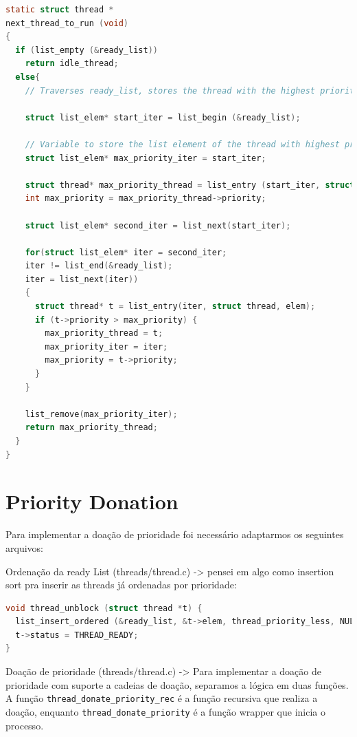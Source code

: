 \documentclass{article}
\begin{document}
\begin{lstlisting}[language=C]
static struct thread *
next_thread_to_run (void) 
{
  if (list_empty (&ready_list))
    return idle_thread;
  else{
    // Traverses ready_list, stores the thread with the highest priority, removes it from the list and return it.
    
    struct list_elem* start_iter = list_begin (&ready_list);

    // Variable to store the list element of the thread with highest priority to remove it at the end of the function
    struct list_elem* max_priority_iter = start_iter;

    struct thread* max_priority_thread = list_entry (start_iter, struct thread, elem);
    int max_priority = max_priority_thread->priority;

    struct list_elem* second_iter = list_next(start_iter);

    for(struct list_elem* iter = second_iter;
    iter != list_end(&ready_list);
    iter = list_next(iter))
    {
      struct thread* t = list_entry(iter, struct thread, elem);
      if (t->priority > max_priority) {
        max_priority_thread = t;
        max_priority_iter = iter;
        max_priority = t->priority;
      }
    }

    list_remove(max_priority_iter);
    return max_priority_thread;
  }
}
\end{lstlisting}

\section*{Priority Donation}
Para implementar a doação de prioridade foi necessário adaptarmos os seguintes arquivos:


Ordenação da ready List (threads/thread.c) -> pensei em algo como insertion sort pra inserir as threads já ordenadas por prioridade: 
\newpage


\begin{lstlisting}[language=C]
void thread_unblock (struct thread *t) {
  list_insert_ordered (&ready_list, &t->elem, thread_priority_less, NULL);
  t->status = THREAD_READY;
}
\end{lstlisting}

\hfill \break

Doação de prioridade (threads/thread.c) -> Para implementar a doação de prioridade com suporte a cadeias de doação, separamos a lógica em duas funções. A função \texttt{thread\_donate\_priority\_rec} é a função recursiva que realiza a doação, enquanto \texttt{thread\_donate\_priority} é a função wrapper que inicia o processo.
\end{document}
